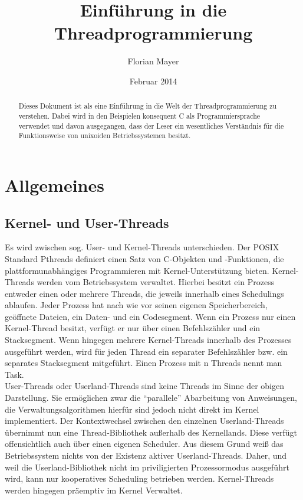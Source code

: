\documentclass[11pt,a4paper]{article}
\begin{document}
\title{\color{black}Einführung in die Threadprogrammierung}
\author{\color{darkblue}Florian Mayer}
\date{\color{lightblue}Februar 2014}
\maketitle

\tableofcontents

\begin{abstract}
Dieses Dokument ist als eine Einführung in die Welt der Threadprogrammierung zu verstehen. Dabei wird in den Beispielen konsequent C als Programmiersprache verwendet und davon ausgegangen, dass der Leser ein wesentliches Verständnis für die Funktionsweise von unixoiden Betriebssystemen besitzt. 
\end{abstract}

\section{Allgemeines}
\subsection{Kernel- und User-Threads}
Es wird zwischen sog. User- und Kernel-Threads unterschieden. 
Der POSIX Standard Pthreads definiert einen Satz von C-Objekten und -Funktionen, die plattformunabhängiges Programmieren mit Kernel-Unterstützung bieten. Kernel-Threads werden vom Betriebssystem verwaltet. Hierbei besitzt ein Prozess entweder einen oder mehrere Threads, die jeweils innerhalb eines Schedulings ablaufen. Jeder Prozess hat nach wie vor seinen eigenen Speicherbereich, geöffnete Dateien, ein Daten- und ein Codesegment. Wenn ein Prozess nur einen Kernel-Thread besitzt, verfügt er nur über einen Befehlszähler und ein Stacksegment. Wenn hingegen mehrere Kernel-Threads innerhalb des Prozesses ausgeführt werden, wird für jeden Thread ein separater Befehlszähler bzw. ein separates Stacksegment mitgeführt. Einen Prozess mit n Threads nennt man Task. \\ 
User-Threads oder Userland-Threads sind keine Threads im Sinne der obigen Darstellung. Sie ermöglichen zwar die ``parallele'' Abarbeitung von Anweisungen, die Verwaltungsalgorithmen hierfür sind jedoch nicht direkt im Kernel implementiert. Der Kontextwechsel zwischen den einzelnen Userland-Threads übernimmt nun eine Thread-Bibliothek außerhalb des Kernellands. Diese verfügt offensichtlich auch über einen eigenen Scheduler. Aus diesem Grund weiß das Betriebssystem nichts von der Existenz aktiver Userland-Threads. Daher, und weil die Userland-Bibliothek nicht im priviligierten Prozessormodus ausgeführt wird, kann nur kooperatives Scheduling betrieben werden. Kernel-Threads werden hingegen präemptiv im Kernel Verwaltet.
\end{document}

